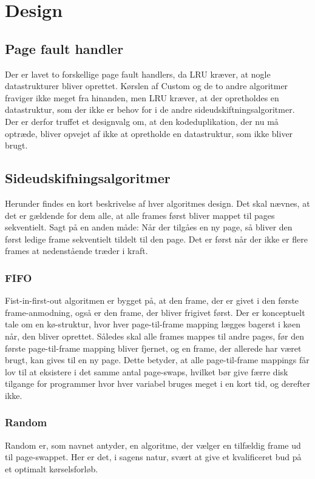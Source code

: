 \section{Design}
\label{sec:design}

\subsection{Page fault handler}
Der er lavet to forskellige page fault handlers, da LRU kræver, at nogle datastrukturer bliver oprettet. Kørslen af Custom og de to andre algoritmer fraviger ikke meget fra hinanden, men LRU kræver, at der opretholdes en datastruktur, som der ikke er behov for i de andre sideudskiftningsalgoritmer. Der er derfor truffet et designvalg om, at den kodeduplikation, der nu må optræde, bliver opvejet af ikke at opretholde en datastruktur, som ikke bliver brugt.  

\subsection{Sideudskifningsalgoritmer}
Herunder findes en kort beskrivelse af hver algoritmes design. Det skal nævnes, at det er gældende for dem alle, at alle frames først bliver mappet til pages sekventielt. Sagt på en anden måde: Når der tilgåes en ny page, så bliver den først ledige frame sekventielt tildelt til den page. Det er først når der ikke er flere frames at nedenstående træder i kraft.
	
	\subsubsection{FIFO}
	Fist-in-first-out algoritmen er bygget på, at den frame, der er givet i den første frame-anmodning, også er den frame, der bliver frigivet først. Der er konceptuelt tale om en kø-struktur, hvor hver page-til-frame mapping lægges bagerst i køen når, den bliver oprettet. Således skal alle frames mappes til andre pages, før den første page-til-frame mapping bliver fjernet, og en frame, der allerede har været brugt, kan gives til en ny page. Dette betyder, at alle page-til-frame mappings får lov til at eksistere i det samme antal page-swaps, hvilket bør give færre disk tilgange for programmer hvor hver variabel bruges meget i en kort tid, og derefter ikke.

	\subsubsection{Random}
	Random er, som navnet antyder, en algoritme, der vælger en tilfældig frame ud til page-swappet. Her er det, i sagens natur, svært at give et kvalificeret bud på et optimalt kørselsforløb.

